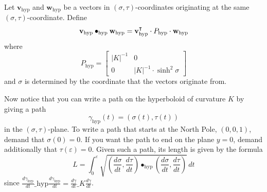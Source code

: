 \documentclass[newpage,hints,,12pt,noauthor,nooutcomes,handout]{ximera}
\begin{document}
\begin{definition}
  Let $\mathbf{v}_\mathrm{hyp}$ and $\mathbf{w}_\mathrm{hyp}$ be a vectors in
  $(\sigma,\tau)$-coordinates originating at the same
  $(\sigma,\tau)$-coordinate. Define
  \[
  \mathbf{v}_\mathrm{hyp} \bullet_\mathrm{hyp} \mathbf{w}_\mathrm{hyp} = \mathbf{v}_\mathrm{hyp}^\intercal \cdot P_\mathrm{hyp} \cdot \mathbf{w}_\mathrm{hyp}
  \]
  where
  \[
     P_\mathrm{hyp} =
  \begin{bmatrix}
    |K|^{-1} & 0 \\
    0 & |K|^{-1}\cdot\sinh^2 \sigma
  \end{bmatrix}
  \]
  and $\sigma$ is determined by the coordinate that the vectors
  originate from.
\end{definition}




Now notice that you can write a path on the hyperboloid of curvature
$K$ by giving a path
\[
\gamma_\mathrm{hyp}(t) = \left( \sigma(t),\tau(t)\right)
\]
in the $(\sigma,\tau)$-plane.  To write a path that starts at the
North Pole, $(0,0,1)$, demand that $\sigma(0)=0$.  If you want the path
to end on the plane $y=0$, demand additionally that
$\tau(\varepsilon)=0$. Given such a path, its length is given by the formula%
\[
L=\int_{0}^\varepsilon \sqrt{\left(\frac{d\sigma}{dt},\frac{d\tau}{dt}\right)
  \bullet_\mathrm{hyp} \left(\frac{d\sigma}{dt},\frac{d\tau}{dt}\right)}\, dt
 \]
 since $\frac{d\gamma_\mathrm{hyp}}{d t} \dot_\mathrm{hyp} \frac{d\gamma_\mathrm{hyp}}{d t}
 = \frac{d\gamma}{d t} \dot_K \frac{d\gamma}{d t}$.
\end{document}
